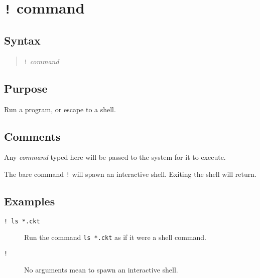 \section{{\tt !} command}
\subsection{Syntax}
\begin{verse}
{\tt !} {{\it command}}
\end{verse}
\subsection{Purpose}

Run a program, or escape to a shell.
\subsection{Comments}

Any {\it command} typed here will be passed to the system for it to execute.

The bare command {\tt !} will spawn an interactive shell.  Exiting the shell
will return.
\subsection{Examples}

\begin{description}

\item[{\tt ! ls *.ckt}] Run the command {\tt ls *.ckt} as if it were a shell
command.

\item[{\tt !}] No arguments mean to spawn an interactive shell.

\end{description}
